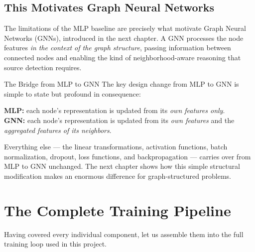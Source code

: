 \subsection{This Motivates Graph Neural Networks}

The limitations of the MLP baseline are precisely what motivate Graph Neural Networks (GNNs), introduced in the next chapter. A GNN processes the node features \emph{in the context of the graph structure}, passing information between connected nodes and enabling the kind of neighborhood-aware reasoning that source detection requires.

\begin{conceptbox}{The Bridge from MLP to GNN}
The key design change from MLP to GNN is simple to state but profound in consequence:

\begin{center}
\textbf{MLP:} each node's representation is updated from its \emph{own features only}.\\[4pt]
\textbf{GNN:} each node's representation is updated from its \emph{own features} and the \emph{aggregated features of its neighbors}.
\end{center}

Everything else --- the linear transformations, activation functions, batch normalization, dropout, loss functions, and backpropagation --- carries over from MLP to GNN unchanged. The next chapter shows how this simple structural modification makes an enormous difference for graph-structured problems.
\end{conceptbox}

\section{The Complete Training Pipeline}
\label{sec:training_pipeline}

Having covered every individual component, let us assemble them into the full training loop used in this project.

